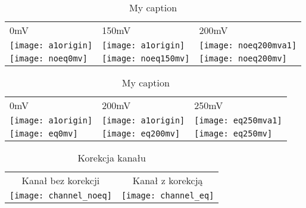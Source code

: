 \begin{table}
\centering
\caption{My caption}
\label{my-label2}
\begin{tabular}{|l|l|l|}
\hline
0mV      & 150mV    & 200mV    \\
\texttt{[image: a1origin]} & \texttt{[image: a1origin]} & \texttt{[image: noeq200mva1]} \\
\texttt{[image: noeq0mv]}   & \texttt{[image: noeq150mv]}   & \texttt{[image: noeq200mv]}  \\ \hline
\end{tabular}
\end{table}


\begin{table}
\centering
\caption{My caption}
\label{my-label}
\begin{tabular}{|l|l|l|}
\hline
0mV      & 200mV    & 250mV    \\
\texttt{[image: a1origin]} & \texttt{[image: a1origin]} & \texttt{[image: eq250mva1]} \\
\texttt{[image: eq0mv]}   & \texttt{[image: eq200mv]}   & \texttt{[image: eq250mv]}  \\ \hline
\end{tabular}
\end{table}

\begin{table}[]
\centering
\caption{Korekcja kanału}
\label{channel_eq}
\begin{tabular}{|c|c|}
\hline
Kanał bez korekcji & Kanał z korekcją \\
\texttt{[image: channel\_noeq]}      & \texttt{[image: channel\_eq]}      \\ \hline
\end{tabular}
\end{table}




